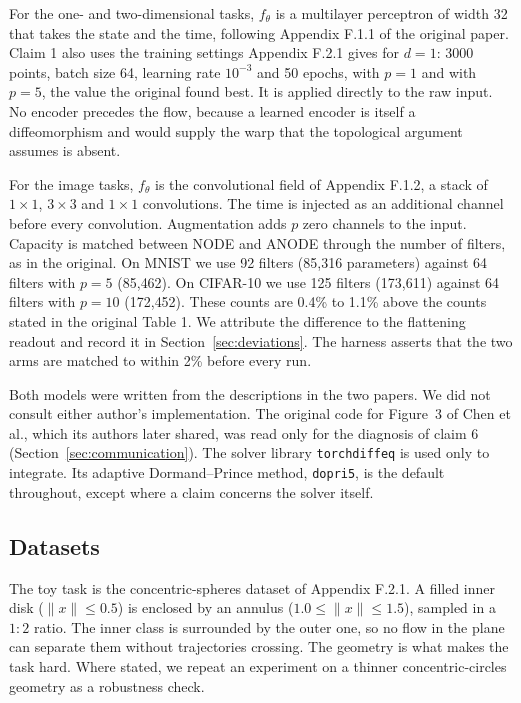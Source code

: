 For the one- and two-dimensional tasks, $f_\theta$ is a multilayer perceptron of width 32
that takes the state and the time, following Appendix F.1.1 of the original paper. Claim 1
also uses the training settings Appendix F.2.1 gives for $d=1$: 3000 points, batch size 64,
learning rate $10^{-3}$ and 50 epochs, with $p=1$ and with $p=5$, the value the original found
best. It is applied
directly to the raw input. No encoder precedes the flow, because a learned encoder is itself
a diffeomorphism and would supply the warp that the topological argument assumes is absent.

For the image tasks, $f_\theta$ is the convolutional field of Appendix F.1.2, a stack of
$1\times1$, $3\times3$ and $1\times1$ convolutions. The time is injected as an additional
channel before every convolution. Augmentation adds $p$ zero channels to the input. Capacity
is matched between NODE and ANODE through the number of filters, as in the original. On MNIST
we use 92 filters (85{,}316 parameters) against 64 filters with $p=5$ (85{,}462). On CIFAR-10
we use 125 filters (173{,}611) against 64 filters with $p=10$ (172{,}452). These counts are 0.4\% to 1.1\% above the counts stated in the original Table 1. We attribute the difference to
the flattening readout and record it in Section~\ref{sec:deviations}. The harness asserts that
the two arms are matched to within 2\% before every run.

Both models were written from the descriptions in the two papers. We did not consult either
author's implementation. The original code for Figure~3 of Chen et al., which its authors
later shared, was read only for the diagnosis of claim 6 (Section~\ref{sec:communication}). The solver library \texttt{torchdiffeq}\supercite{torchdiffeq} is
used only to integrate. Its adaptive Dormand--Prince method, \texttt{dopri5}, is the default
throughout, except where a claim concerns the solver itself.

\subsection{Datasets}

The toy task is the concentric-spheres dataset of Appendix F.2.1. A filled inner disk
($\lVert x\rVert \le 0.5$) is enclosed by an annulus ($1.0 \le \lVert x\rVert \le 1.5$),
sampled in a $1{:}2$ ratio. The inner class is surrounded by the outer one, so no flow in the
plane can separate them without trajectories crossing. The geometry is what makes the task
hard. Where stated, we repeat an experiment on a thinner concentric-circles geometry as a
robustness check.

